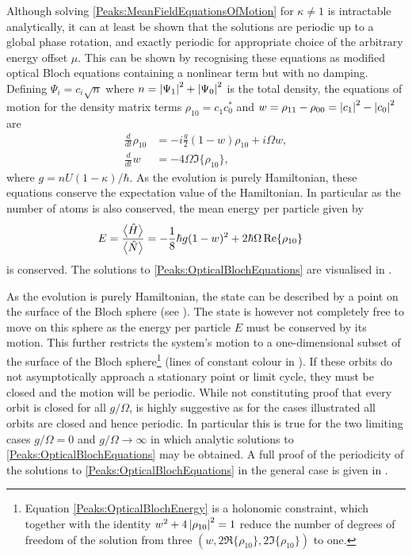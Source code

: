 Although solving \eqref{Peaks:MeanFieldEquationsOfMotion} for $\kappa \neq 1$ is intractable analytically, it can at least be shown that the solutions are periodic up to a global phase rotation, and exactly periodic for appropriate choice of the arbitrary energy offset $\mu$. This can be shown by recognising these equations as modified optical Bloch equations containing a nonlinear term but with no damping. Defining $\Psi_i = c_i\sqrt{n}$ where $n = \left|\Psi_1\right|^2 + \left|\Psi_0\right|^2$ is the total density, the equations of motion for the density matrix terms $\rho_{10} = c_{1}^{}c_{0}^*$ and $w = \rho_{11}-\rho_{00} = \left|c_1\right|^2 - \left|c_0\right|^2$ are
\begin{subequations}
    \label{Peaks:OpticalBlochEquations}
    \begin{align}
        \frac{d}{dt}\rho_{10} &= -i\frac{g}{2} (1-w)\rho_{10} + i \Omega w,\\
        \frac{d }{dt}w &= -4 \Omega \Im\{\rho_{10}\},
    \end{align}
\end{subequations}
where $g = n U (1-\kappa)/\hbar$. As the evolution is purely Hamiltonian, these equations conserve the expectation value of the Hamiltonian. In particular as the number of atoms is also conserved, the mean energy per particle given by
\begin{align}
    E &= \frac{\mean{\hat{H}}}{\mean{\hat{N}}} = -\frac{1}{8}\hbar g(1 - w)^2 + 2 \hbar \Omega \Re\{\rho_{10}\}
    \label{Peaks:OpticalBlochEnergy}
\end{align}
is conserved. The solutions to \eqref{Peaks:OpticalBlochEquations} are visualised in .

As the evolution is purely Hamiltonian, the state can be described by a point on the surface of the Bloch sphere (see ).  The state is however not completely free to move on this sphere as the energy per particle $E$ must be conserved by its motion. This further restricts the system's motion to a one-dimensional subset of the surface of the Bloch sphere\footnote{Equation \eqref{Peaks:OpticalBlochEnergy} is a holonomic constraint, which together with the identity $w^2 + 4 \left|\rho_{10}\right|^2=1$ reduce the number of degrees of freedom of the solution from three $(w, 2\Re\{\rho_{10}\}, 2\Im\{\rho_{10}\})$ to one.} (lines of constant colour in ). If these orbits do not asymptotically approach a stationary point or limit cycle, they must be closed and the motion will be periodic.  While not constituting proof that every orbit is closed for all $g/\Omega$,  is highly suggestive as for the cases illustrated all orbits are closed and hence periodic. In particular this is true for the two limiting cases $g/\Omega = 0$ and $g/\Omega \rightarrow \infty$ in which analytic solutions to \eqref{Peaks:OpticalBlochEquations} may be obtained.  A full proof of the periodicity of the solutions to \eqref{Peaks:OpticalBlochEquations} in the general case is given in .

